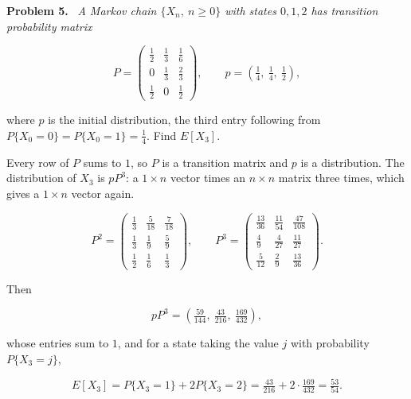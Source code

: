 \documentclass[11pt]{article}
\newenvironment{problem}[1]
  {\par\medskip\noindent\textbf{Problem #1.}\ \itshape}
  {\par\medskip}
\begin{document}
\begin{problem}{5}
A Markov chain $\{X_n,\ n\ge 0\}$ with states $0,1,2$ has transition probability matrix

$$P=\begin{pmatrix} \tfrac12 & \tfrac13 & \tfrac16 \\[2pt] 0 & \tfrac13 & \tfrac23 \\[2pt] \tfrac12 & 0 & \tfrac12 \end{pmatrix}, \qquad p=\left(\tfrac14,\ \tfrac14,\ \tfrac12\right),$$

where $p$ is the initial distribution, the third entry following from $P\{X_0=0\}=P\{X_0=1\}=\tfrac14$. Find $E[X_3]$.
\end{problem}
Every row of $P$ sums to $1$, so $P$ is a transition matrix and $p$ is a distribution. The distribution of $X_3$ is $pP^3$: a $1\times n$ vector times an $n\times n$ matrix three times, which gives a $1\times n$ vector again.

$$P^2 = \begin{pmatrix} \tfrac13 & \tfrac5{18} & \tfrac7{18} \\[2pt] \tfrac13 & \tfrac19 & \tfrac59 \\[2pt] \tfrac12 & \tfrac16 & \tfrac13 \end{pmatrix}, \qquad
P^3 = \begin{pmatrix} \tfrac{13}{36} & \tfrac{11}{54} & \tfrac{47}{108} \\[2pt] \tfrac49 & \tfrac4{27} & \tfrac{11}{27} \\[2pt] \tfrac5{12} & \tfrac29 & \tfrac{13}{36} \end{pmatrix}.$$

Then

$$pP^3 = \left(\tfrac{59}{144},\ \tfrac{43}{216},\ \tfrac{169}{432}\right),$$

whose entries sum to $1$, and for a state taking the value $j$ with probability $P\{X_3=j\}$,

$$E[X_3] = P\{X_3=1\} + 2P\{X_3=2\} = \tfrac{43}{216} + 2\cdot\tfrac{169}{432} = \tfrac{53}{54}.$$
\end{document}
